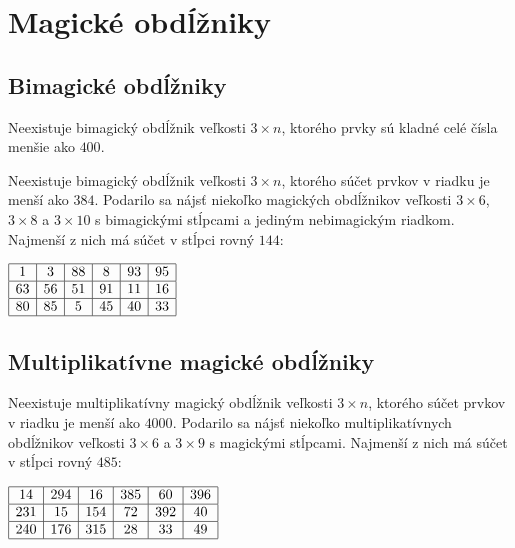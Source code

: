 \section{Magické obdĺžniky}

\subsection{Bimagické obdĺžniky}

\begin{result} Neexistuje bimagický obdĺžnik veľkosti $3 \times n$, ktorého prvky sú kladné celé čísla menšie ako $400$.
\end{result} 

\begin{result} Neexistuje bimagický obdĺžnik veľkosti $3 \times n$, ktorého súčet prvkov v riadku je menší ako $384$. Podarilo sa nájsť niekoľko magických obdĺžnikov veľkosti $3 \times 6$, $3 \times 8$ a $3 \times 10$ s bimagickými stĺpcami a jediným nebimagickým riadkom. Najmenší z nich má súčet v stĺpci rovný $144$:
\end{result}

\begin{center}
$\begin{array}{ |c|c|c|c|c|c| } 
\hline
1 & 3 & 88 & 8 & 93 & 95 \\ 
\hline
63 & 56 & 51 & 91 & 11 & 16 \\ 
\hline
80 & 85 & 5 & 45 & 40 & 33 \\ 
\hline
\end{array}$
\end{center}


\subsection{Multiplikatívne magické obdĺžniky}

\begin{result} Neexistuje multiplikatívny magický obdĺžnik veľkosti $3 \times n$, ktorého súčet prvkov v riadku je menší ako $4000$. Podarilo sa nájsť niekoľko multiplikatívnych obdĺžnikov veľkosti $3 \times 6$ a $3 \times 9$ s magickými stĺpcami. Najmenší z nich má súčet v stĺpci rovný $485$:
\end{result}

\begin{center}
$\begin{array}{ |c|c|c|c|c|c| } 
\hline
14 & 294 & 16 & 385 & 60 & 396 \\ 
\hline
231 & 15 & 154 & 72 & 392 & 40 \\ 
\hline
240 & 176 & 315 & 28 & 33 & 49 \\ 
\hline
\end{array}$
\end{center}



